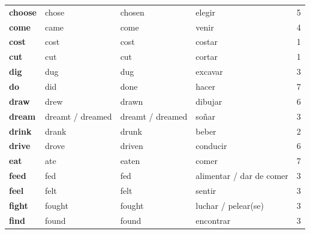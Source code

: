 \documentclass[11pt,a4paper]{article}
\begin{document}
\begin{longtable}{>{\bfseries}p{2.6cm}p{3.4cm}p{3.6cm}>{\raggedright\arraybackslash}p{6.0cm}c}
\textcolor{rojoO}{choose} & \textcolor{rojoO}{chose} & \textcolor{rojoO}{chosen} & \textcolor{rojoO}{elegir} & \textcolor{rojoO}{5}\\
\textcolor{moradoO}{come} & \textcolor{moradoO}{came} & \textcolor{moradoO}{come} & \textcolor{moradoO}{venir} & \textcolor{moradoO}{4}\\
\textcolor{amarilloO}{cost} & \textcolor{amarilloO}{cost} & \textcolor{amarilloO}{cost} & \textcolor{amarilloO}{costar} & \textcolor{amarilloO}{1}\\
\textcolor{amarilloO}{cut} & \textcolor{amarilloO}{cut} & \textcolor{amarilloO}{cut} & \textcolor{amarilloO}{cortar} & \textcolor{amarilloO}{1}\\
\textcolor{verdeO}{dig} & \textcolor{verdeO}{dug} & \textcolor{verdeO}{dug} & \textcolor{verdeO}{excavar} & \textcolor{verdeO}{3}\\
\textcolor{azulO}{do} & \textcolor{azulO}{did} & \textcolor{azulO}{done} & \textcolor{azulO}{hacer} & \textcolor{azulO}{7}\\
\textcolor{rosaO}{draw} & \textcolor{rosaO}{drew} & \textcolor{rosaO}{drawn} & \textcolor{rosaO}{dibujar} & \textcolor{rosaO}{6}\\
\textcolor{verdeO}{dream} & \textcolor{verdeO}{dreamt / dreamed} & \textcolor{verdeO}{dreamt / dreamed} & \textcolor{verdeO}{soñar} & \textcolor{verdeO}{3}\\
\textcolor{naranjaO}{drink} & \textcolor{naranjaO}{drank} & \textcolor{naranjaO}{drunk} & \textcolor{naranjaO}{beber} & \textcolor{naranjaO}{2}\\
\textcolor{rosaO}{drive} & \textcolor{rosaO}{drove} & \textcolor{rosaO}{driven} & \textcolor{rosaO}{conducir} & \textcolor{rosaO}{6}\\
\textcolor{azulO}{eat} & \textcolor{azulO}{ate} & \textcolor{azulO}{eaten} & \textcolor{azulO}{comer} & \textcolor{azulO}{7}\\
\textcolor{verdeO}{feed} & \textcolor{verdeO}{fed} & \textcolor{verdeO}{fed} & \textcolor{verdeO}{alimentar / dar de comer} & \textcolor{verdeO}{3}\\
\textcolor{verdeO}{feel} & \textcolor{verdeO}{felt} & \textcolor{verdeO}{felt} & \textcolor{verdeO}{sentir} & \textcolor{verdeO}{3}\\
\textcolor{verdeO}{fight} & \textcolor{verdeO}{fought} & \textcolor{verdeO}{fought} & \textcolor{verdeO}{luchar / pelear(se)} & \textcolor{verdeO}{3}\\
\textcolor{verdeO}{find} & \textcolor{verdeO}{found} & \textcolor{verdeO}{found} & \textcolor{verdeO}{encontrar} & \textcolor{verdeO}{3}\\

\end{longtable}
\end{document}
